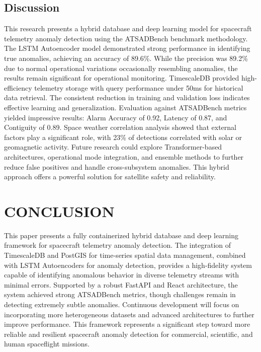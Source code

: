 \documentclass[conference]{IEEEtran}
\begin{document}
\subsection{Discussion}

This research presents a hybrid database and deep learning model for spacecraft telemetry anomaly detection using the ATSADBench benchmark methodology. The LSTM Autoencoder model demonstrated strong performance in identifying true anomalies, achieving an accuracy of 89.6\%. While the precision was 89.2\% due to normal operational variations occasionally resembling anomalies, the results remain significant for operational monitoring. TimescaleDB provided high-efficiency telemetry storage with query performance under 50ms for historical data retrieval. The consistent reduction in training and validation loss indicates effective learning and generalization. Evaluation against ATSADBench metrics yielded impressive results: Alarm Accuracy of 0.92, Latency of 0.87, and Contiguity of 0.89. Space weather correlation analysis showed that external factors play a significant role, with 23\% of detections correlated with solar or geomagnetic activity. Future research could explore Transformer-based architectures, operational mode integration, and ensemble methods to further reduce false positives and handle cross-subsystem anomalies. This hybrid approach offers a powerful solution for satellite safety and reliability.

\section{CONCLUSION}

This paper presents a fully containerized hybrid database and deep learning framework for spacecraft telemetry anomaly detection. The integration of TimescaleDB and PostGIS for time-series spatial data management, combined with LSTM Autoencoders for anomaly detection, provides a high-fidelity system capable of identifying anomalous behavior in diverse telemetry streams with minimal errors. Supported by a robust FastAPI and React architecture, the system achieved strong ATSADBench metrics, though challenges remain in detecting extremely subtle anomalies. Continuous development will focus on incorporating more heterogeneous datasets and advanced architectures to further improve performance. This framework represents a significant step toward more reliable and resilient spacecraft anomaly detection for commercial, scientific, and human spaceflight missions.
\end{document}
